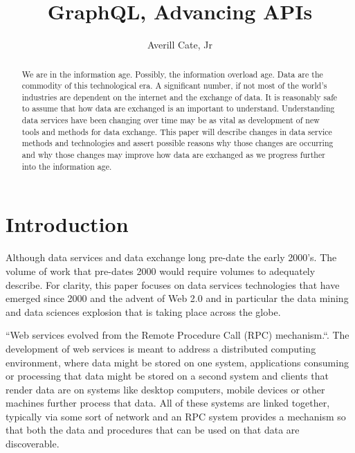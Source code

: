 
\title{GraphQL, Advancing APIs}

\author{Averill Cate, Jr}

\renewcommand{\shortauthors}{A. Cate, Jr}

\begin{abstract}
We are in the information age.  Possibly, the information overload age.
Data are the commodity of this technological era.  A significant number, if not
most of the world's industries are dependent on the internet and the exchange
of data.  It is reasonably safe to assume that how data are exchanged is
an important to understand.  Understanding data services have been changing
over time may be as vital as development of new tools and methods for data
exchange.  This paper will describe changes in data service methods and 
technologies and assert possible reasons why those changes are occurring and 
why those changes may improve how data are exchanged as we progress further 
into the information age.
\end{abstract}


\maketitle

\section{Introduction}
Although data services and data exchange long pre-date the early 2000's.  The
volume of work that pre-dates 2000 would require volumes to adequately describe.
For clarity, this paper focuses on data services technologies that have emerged
since 2000 and the advent of Web 2.0 and in particular the data mining and
data sciences explosion that is taking place across the globe.

``Web services evolved from the Remote Procedure Call (RPC) mechanism.``\cite{Kalin2009}.  
The development of web services is meant to address a distributed computing 
environment, where data might be stored on one system, applications consuming 
or processing that data might be stored on a second system and clients that 
render data are on systems like desktop computers, mobile devices or other 
machines further process that data.  All of these systems are linked together, 
typically via some sort of network and an RPC system provides a mechanism so 
that both the data and procedures that can be used on that data are 
discoverable\cite{Kalin2009}.

